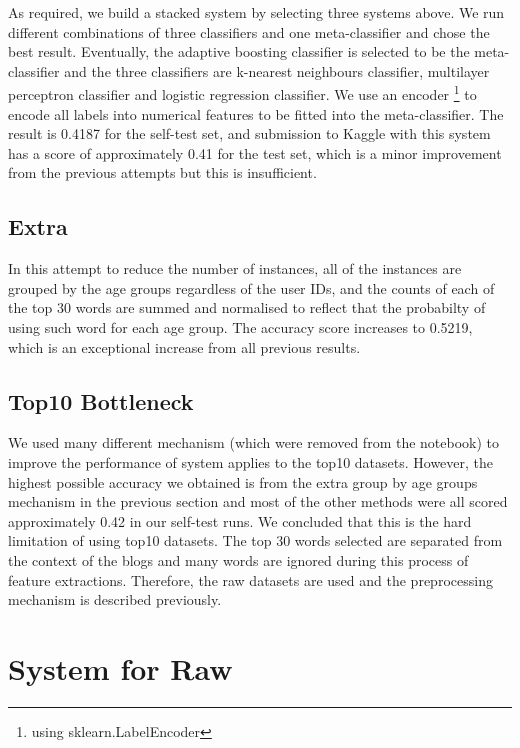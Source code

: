 \documentclass[10pt]{article}
\begin{document}
As required, we build a stacked system by selecting three systems above. We run different combinations of three classifiers and one meta-classifier and chose the best result. Eventually, the adaptive boosting classifier is selected to be the meta-classifier and the three classifiers are k-nearest neighbours classifier, multilayer perceptron classifier and logistic regression classifier. We use an encoder
\footnote{using sklearn.LabelEncoder}
to encode all labels into numerical features to be fitted into the meta-classifier. The result is 0.4187 for the self-test set, and submission to Kaggle with this system has a score of approximately 0.41 for the test set, which is a minor improvement from the previous attempts but this is insufficient.

\subsection{Extra}
\justify

In this attempt to reduce the number of instances, all of the instances are grouped by the age groups regardless of the user IDs, and the counts of each of the top 30 words are summed and normalised to reflect that the probabilty of using such word for each age group. The accuracy score increases to 0.5219, which is an exceptional increase from all previous results.

\subsection{Top10 Bottleneck}
\justify

We used many different mechanism (which were removed from the notebook) to improve the performance of system applies to the top10 datasets. However, the highest possible accuracy we obtained is from the extra group by age groups mechanism in the previous section and most of the other methods were all scored approximately 0.42 in our self-test runs. We concluded that this is the hard limitation of using top10 datasets. The top 30 words selected are separated from the context of the blogs and many words are ignored during this process of feature extractions. Therefore, the raw datasets are used and the preprocessing mechanism is described previously.

\section{System for Raw}
\justify
\end{document}
